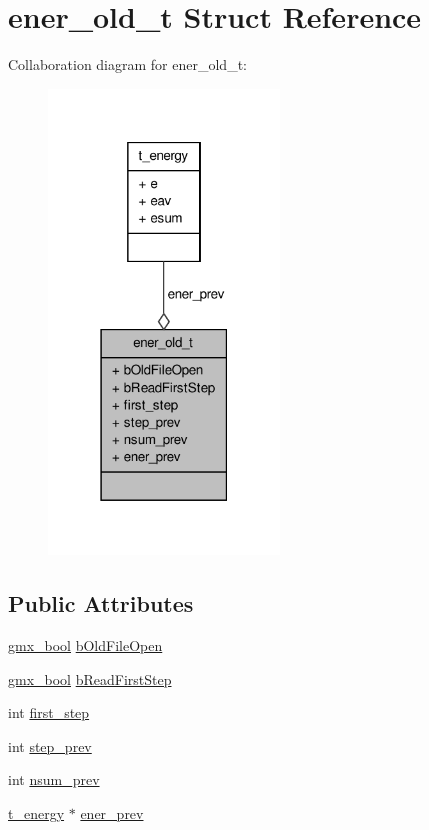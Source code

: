 \hypertarget{structener__old__t}{\section{ener\-\_\-old\-\_\-t \-Struct \-Reference}
\label{structener__old__t}
}


\-Collaboration diagram for ener\-\_\-old\-\_\-t\-:
\nopagebreak
\begin{figure}[H]
\begin{center}
\leavevmode
\includegraphics[width=174pt]{structener__old__t__coll__graph}
\end{center}
\end{figure}
\subsection*{\-Public \-Attributes}
\begin{DoxyCompactItemize}
\item 
\hyperlink{include_2types_2simple_8h_a8fddad319f226e856400d190198d5151}{gmx\-\_\-bool} \hyperlink{structener__old__t_aa21582328f77bfecee554d0c9a4ddb07}{b\-Old\-File\-Open}
\item 
\hyperlink{include_2types_2simple_8h_a8fddad319f226e856400d190198d5151}{gmx\-\_\-bool} \hyperlink{structener__old__t_a6a2df0a7656600a0673ae68351adc25b}{b\-Read\-First\-Step}
\item 
int \hyperlink{structener__old__t_ae68952615f58d2e40ad5b8a51e763a3c}{first\-\_\-step}
\item 
int \hyperlink{structener__old__t_ac5943539fd94320fea68a8ed5c439727}{step\-\_\-prev}
\item 
int \hyperlink{structener__old__t_ac214c8112880c5cb95ddd720019146ec}{nsum\-\_\-prev}
\item 
\hyperlink{structt__energy}{t\-\_\-energy} $\ast$ \hyperlink{structener__old__t_aef5ec243468f37eacca1e05b0d040671}{ener\-\_\-prev}
\end{DoxyCompactItemize}


